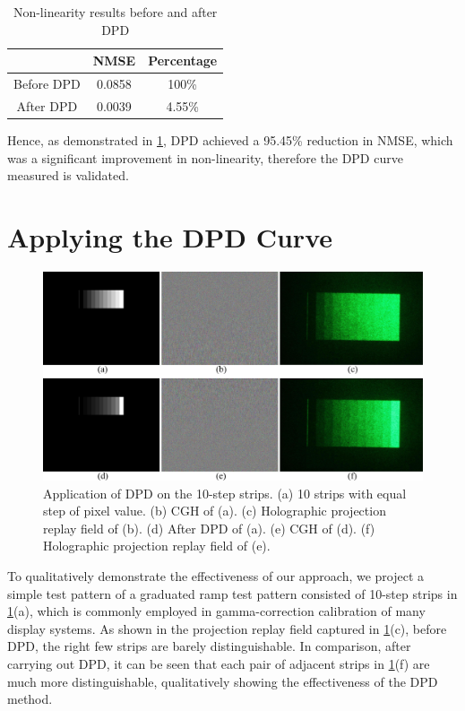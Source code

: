 \begin{table}[H]
    \begin{center}
        \begin{tabular}{|c|c|c|}
            \hline
                       & NMSE   & Percentage \\ \hline
            Before DPD & 0.0858 & 100\%      \\ \hline
            After DPD  & 0.0039 & 4.55\%     \\ \hline
        \end{tabular}
        \caption{Non-linearity results before and after DPD}
        \label{tab:non-linearity result}
    \end{center}
\end{table}

Hence, as demonstrated in \cref{tab:non-linearity result}, DPD achieved a 95.45\% reduction in NMSE, which was a significant improvement in non-linearity, therefore the DPD curve measured is validated.




\section{Applying the DPD Curve}

\begin{figure}[H]
    \centering
    \includegraphics[width=\textwidth]{10_step_strips.jpg}
    \caption{Application of DPD on the 10-step strips. (a) 10 strips with equal step of pixel value. (b) CGH of (a). (c) Holographic projection replay field of (b). (d) After DPD of (a). (e) CGH of (d). (f) Holographic projection replay field of (e).}
    \label{fig:10_step_strips}
\end{figure}
\vspace{3mm}

To qualitatively demonstrate the effectiveness of our approach, we project a simple test pattern of a graduated ramp test pattern consisted of 10-step strips in \cref{fig:10_step_strips}(a), which is commonly employed in gamma-correction calibration of many display systems. As shown in the projection replay field captured in \cref{fig:10_step_strips}(c), before DPD, the right few strips are barely distinguishable. In comparison, after carrying out DPD, it can be seen that each pair of adjacent strips in \cref{fig:10_step_strips}(f) are much more distinguishable, qualitatively showing the effectiveness of the DPD method.

